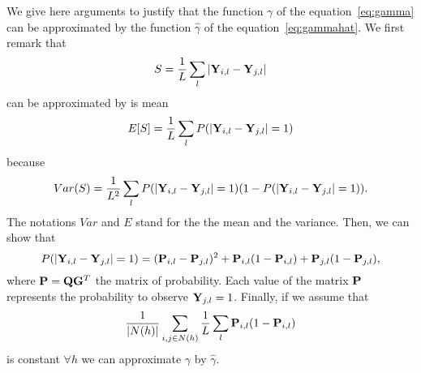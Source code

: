 We give here arguments to justify that the function $\gamma$ of the equation~\eqref{eq:gamma} can be approximated by the function $\hat{\gamma}$ of the equation~\eqref{eq:gammahat}. We first remark that
$$
S = \frac{1}{L} \sum_l |{\bf Y}_{i,l} - {\bf Y}_{j,l}|
$$
can be approximated by is mean 
$$
E[S] = \frac{1}{L} \sum_l P(|{\bf Y}_{i,l} - {\bf Y}_{j,l}| = 1)
$$
because 
$$
Var(S) = \frac{1}{L^2} \sum_l P(|{\bf Y}_{i,l} - {\bf Y}_{j,l}| = 1) 
( 1 - P(|{\bf Y}_{i,l} - {\bf Y}_{j,l}| = 1)).
$$
The notations $Var$ and $E$ stand for the the mean and the variance. Then, we can show that 
$$
P(|{\bf Y}_{i,l} - {\bf Y}_{j,l}| = 1) = ({\bf P}_{i,l} - {\bf P}_{j,l})^2 + {\bf P}_{i,l} (1 - {\bf P}_{i,l}) + {\bf P}_{j,l} (1 - {\bf P}_{j,l}),
$$
\noindent where ${\bf P} = {\bf Q} {\bf G}^T$ the matrix of probability. Each value of the matrix ${\bf P}$ represents the probability to observe ${\bf Y}_{j,l} = 1$. Finally, if we assume that 
$$
\frac{1}{|N(h)|} \sum_{i,j \in N(h)} \frac{1}{L} \sum_l  {\bf P}_{i,l} (1 - {\bf P}_{i,l})
$$
is constant $\forall h$ we can approximate $\gamma$ by $\hat{\gamma}$. 
